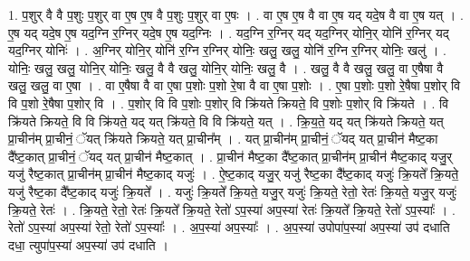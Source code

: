 \documentclass[17pt]{extarticle}
\begin{document}
1. प॒शुर् वै वै प॒शुः प॒शुर् वा ए॒ष ए॒ष वै प॒शुः प॒शुर् वा ए॒षः । . वा ए॒ष ए॒ष वै वा ए॒ष यद् यदे॒ष वै वा ए॒ष यत् । . ए॒ष यद् यदे॒ष ए॒ष यद॒ग्नि र॒ग्निर् यदे॒ष ए॒ष यद॒ग्निः । . यद॒ग्नि र॒ग्निर् यद् यद॒ग्निर् योनि॒र् योनि॑ र॒ग्निर् यद् यद॒ग्निर् योनिः॑ । . अ॒ग्निर् योनि॒र् योनि॑ र॒ग्नि र॒ग्निर् योनिः॒ खलु॒ खलु॒ योनि॑ र॒ग्नि र॒ग्निर् योनिः॒ खलु॑ । . योनिः॒ खलु॒ खलु॒ योनि॒र् योनिः॒ खलु॒ वै वै खलु॒ योनि॒र् योनिः॒ खलु॒ वै । . खलु॒ वै वै खलु॒ खलु॒ वा ए॒षैषा वै खलु॒ खलु॒ वा ए॒षा । . वा ए॒षैषा वै वा ए॒षा प॒शोः प॒शो रे॒षा वै वा ए॒षा प॒शोः । . ए॒षा प॒शोः प॒शो रे॒षैषा प॒शोर् वि वि प॒शो रे॒षैषा प॒शोर् वि । . प॒शोर् वि वि प॒शोः प॒शोर् वि क्रि॑यते क्रियते॒ वि प॒शोः प॒शोर् वि क्रि॑यते । . वि क्रि॑यते क्रियते॒ वि वि क्रि॑यते॒ यद् यत् क्रि॑यते॒ वि वि क्रि॑यते॒ यत् । . क्रि॒य॒ते॒ यद् यत् क्रि॑यते क्रियते॒ यत् प्रा॒चीन॑म् प्रा॒चीनं॒ ॅयत् क्रि॑यते क्रियते॒ यत् प्रा॒चीन᳚म् । . यत् प्रा॒चीन॑म् प्रा॒चीनं॒ ॅयद् यत् प्रा॒चीन॑ मैष्ट॒का दै᳚ष्ट॒कात् प्रा॒चीनं॒ ॅयद् यत् प्रा॒चीन॑ मैष्ट॒कात् । . प्रा॒चीन॑ मैष्ट॒का दै᳚ष्ट॒कात् प्रा॒चीन॑म् प्रा॒चीन॑ मैष्ट॒काद् यजु॒र् यजु॑ रैष्ट॒कात् प्रा॒चीन॑म् प्रा॒चीन॑ मैष्ट॒काद् यजुः॑ । . ऐ॒ष्ट॒काद् यजु॒र् यजु॑ रैष्ट॒का दै᳚ष्ट॒काद् यजुः॑ क्रि॒यते᳚ क्रि॒यते॒ यजु॑ रैष्ट॒का दै᳚ष्ट॒काद् यजुः॑ क्रि॒यते᳚ । . यजुः॑ क्रि॒यते᳚ क्रि॒यते॒ यजु॒र् यजुः॑ क्रि॒यते॒ रेतो॒ रेतः॑ क्रि॒यते॒ यजु॒र् यजुः॑ क्रि॒यते॒ रेतः॑ । . क्रि॒यते॒ रेतो॒ रेतः॑ क्रि॒यते᳚ क्रि॒यते॒ रेतो॑ ऽप॒स्या॑ अप॒स्या॑ रेतः॑ क्रि॒यते᳚ क्रि॒यते॒ रेतो॑ ऽप॒स्याः᳚ । . रेतो॑ ऽप॒स्या॑ अप॒स्या॑ रेतो॒ रेतो॑ ऽप॒स्याः᳚ । . अ॒प॒स्या॑ अप॒स्याः᳚ । . अ॒प॒स्या॑ उपोपा॑प॒स्या॑ अप॒स्या॑ उप॑ दधाति दधा॒ त्युपा॑प॒स्या॑ अप॒स्या॑ उप॑ दधाति । \newline
\end{document}
